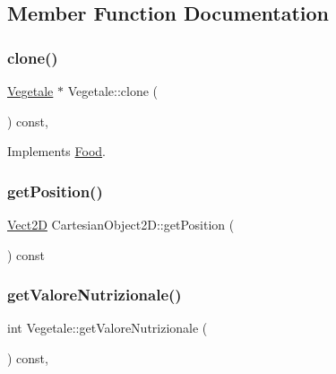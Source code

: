 \subsection{Member Function Documentation}
\mbox{\label{classVegetale_a969a0aae9c47a8dbb6acb3080fb98984_a969a0aae9c47a8dbb6acb3080fb98984}} 
\subsubsection{\texorpdfstring{clone()}{clone()}}
{\footnotesize\ttfamily \hyperlink{classVegetale}{Vegetale} $\ast$ Vegetale\+::clone (\begin{DoxyParamCaption}{ }\end{DoxyParamCaption}) const\hspace{0.3cm}{\ttfamily [override]}, {\ttfamily [virtual]}}



Implements \hyperlink{classFood_a81ef8f27be431b43bfa244fde21ec90d_a81ef8f27be431b43bfa244fde21ec90d}{Food}.

\mbox{\label{classCartesianObject2D_aa3a6b63777852ab9eb9408ed2536abe2_aa3a6b63777852ab9eb9408ed2536abe2}} 
\subsubsection{\texorpdfstring{get\+Position()}{getPosition()}}
{\footnotesize\ttfamily \hyperlink{classVect2D}{Vect2D} Cartesian\+Object2\+D\+::get\+Position (\begin{DoxyParamCaption}{ }\end{DoxyParamCaption}) const\hspace{0.3cm}{\ttfamily [inherited]}}

\mbox{\label{classVegetale_a6f174aa44bf87ea44f3737390f1e6490_a6f174aa44bf87ea44f3737390f1e6490}} 
\subsubsection{\texorpdfstring{get\+Valore\+Nutrizionale()}{getValoreNutrizionale()}}
{\footnotesize\ttfamily int Vegetale\+::get\+Valore\+Nutrizionale (\begin{DoxyParamCaption}{ }\end{DoxyParamCaption}) const\hspace{0.3cm}{\ttfamily [override]}, {\ttfamily [virtual]}}



